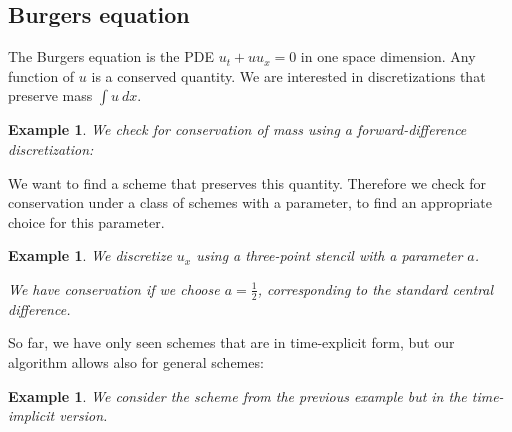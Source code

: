 \documentclass[sigconf,twocolumn]{acmart}
\newcommand{\1}{{\chi}}
\numberwithin{equation}{section}
\theoremstyle{thmlemcorr}
\numberwithin{theorem}{section}
\theoremstyle{thmlemcorr*}
\theoremstyle{defi}
\theoremstyle{remexample}
\newtheorem{example}[theorem]{Example}
\theoremstyle{ass}
\begin{document}
\subsection*{Burgers equation}
The Burgers equation is the PDE $u_t+uu_x=0$ \cite{smoller94} in one space dimension. Any function of $u$ is a conserved quantity. We are interested in discretizations that preserve mass $\int u\ dx$.
\begin{example}
	We check for conservation of mass using a forward-difference discretization:
	
	\begin{small}
		
		
	\end{small}
\end{example}
We want to find a scheme that preserves this quantity. Therefore we check for conservation under a class of schemes with a parameter, to find an appropriate choice for this parameter.
\begin{example}
	We discretize $u_x$ using a three-point stencil with a parameter $a$.
	
	\begin{small}
		
		
	\end{small}
	We have conservation if we choose $a=\frac{1}{2}$, corresponding to the standard central difference.
\end{example}
So far, we have only seen schemes that are in time-explicit form, but our algorithm allows also for general schemes:
\begin{example}
	We consider the scheme from the previous example but in the time-implicit version.
	
	\begin{small}
		
		
	\end{small}
\end{example}
\end{document}
